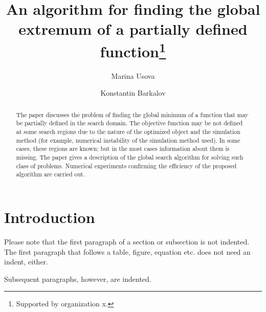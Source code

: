 \documentclass[runningheads]{llncs}
\begin{document}
%
\title{An algorithm for finding the global extremum 
of a partially defined function\thanks{Supported by organization x.}}
%
%
\author{Marina Usova \and
Konstantin Barkalov}
%
%
%
\maketitle              %
%
\begin{abstract}
The paper discusses the problem of finding the global minimum of a function that may be partially defined in the search domain. The objective function may be not defined at some search regions due to the nature of the optimized object and the simulation method (for example, numerical instability of the simulation method used). In some cases, these regions are known; but in the most cases information about them is missing. The paper gives a description of the global search algorithm for solving such class of problems. Numerical experiments confirming the efficiency of the proposed algorithm are carried out.

\end{abstract}
%
%
%
\section{Introduction}
Please note that the first paragraph of a section or subsection is
not indented. The first paragraph that follows a table, figure,
equation etc. does not need an indent, either.

Subsequent paragraphs, however, are indented.
\end{document}
